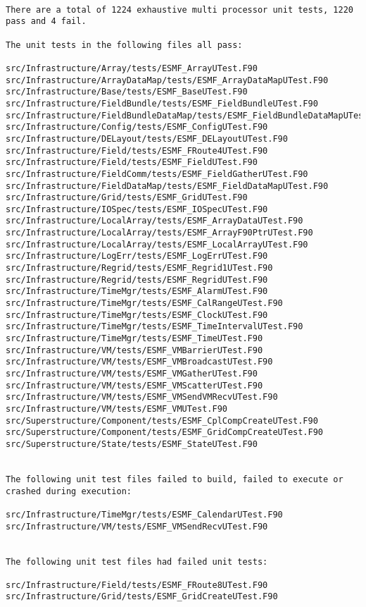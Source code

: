 \begin{verbatim}

There are a total of 1224 exhaustive multi processor unit tests, 1220 pass and 4 fail.

The unit tests in the following files all pass:

src/Infrastructure/Array/tests/ESMF_ArrayUTest.F90
src/Infrastructure/ArrayDataMap/tests/ESMF_ArrayDataMapUTest.F90
src/Infrastructure/Base/tests/ESMF_BaseUTest.F90
src/Infrastructure/FieldBundle/tests/ESMF_FieldBundleUTest.F90
src/Infrastructure/FieldBundleDataMap/tests/ESMF_FieldBundleDataMapUTest.F90
src/Infrastructure/Config/tests/ESMF_ConfigUTest.F90
src/Infrastructure/DELayout/tests/ESMF_DELayoutUTest.F90
src/Infrastructure/Field/tests/ESMF_FRoute4UTest.F90
src/Infrastructure/Field/tests/ESMF_FieldUTest.F90
src/Infrastructure/FieldComm/tests/ESMF_FieldGatherUTest.F90
src/Infrastructure/FieldDataMap/tests/ESMF_FieldDataMapUTest.F90
src/Infrastructure/Grid/tests/ESMF_GridUTest.F90
src/Infrastructure/IOSpec/tests/ESMF_IOSpecUTest.F90
src/Infrastructure/LocalArray/tests/ESMF_ArrayDataUTest.F90
src/Infrastructure/LocalArray/tests/ESMF_ArrayF90PtrUTest.F90
src/Infrastructure/LocalArray/tests/ESMF_LocalArrayUTest.F90
src/Infrastructure/LogErr/tests/ESMF_LogErrUTest.F90
src/Infrastructure/Regrid/tests/ESMF_Regrid1UTest.F90
src/Infrastructure/Regrid/tests/ESMF_RegridUTest.F90
src/Infrastructure/TimeMgr/tests/ESMF_AlarmUTest.F90
src/Infrastructure/TimeMgr/tests/ESMF_CalRangeUTest.F90
src/Infrastructure/TimeMgr/tests/ESMF_ClockUTest.F90
src/Infrastructure/TimeMgr/tests/ESMF_TimeIntervalUTest.F90
src/Infrastructure/TimeMgr/tests/ESMF_TimeUTest.F90
src/Infrastructure/VM/tests/ESMF_VMBarrierUTest.F90
src/Infrastructure/VM/tests/ESMF_VMBroadcastUTest.F90
src/Infrastructure/VM/tests/ESMF_VMGatherUTest.F90
src/Infrastructure/VM/tests/ESMF_VMScatterUTest.F90
src/Infrastructure/VM/tests/ESMF_VMSendVMRecvUTest.F90
src/Infrastructure/VM/tests/ESMF_VMUTest.F90
src/Superstructure/Component/tests/ESMF_CplCompCreateUTest.F90
src/Superstructure/Component/tests/ESMF_GridCompCreateUTest.F90
src/Superstructure/State/tests/ESMF_StateUTest.F90


The following unit test files failed to build, failed to execute or crashed during execution:

src/Infrastructure/TimeMgr/tests/ESMF_CalendarUTest.F90
src/Infrastructure/VM/tests/ESMF_VMSendRecvUTest.F90


The following unit test files had failed unit tests:

src/Infrastructure/Field/tests/ESMF_FRoute8UTest.F90
src/Infrastructure/Grid/tests/ESMF_GridCreateUTest.F90



\end{verbatim}
